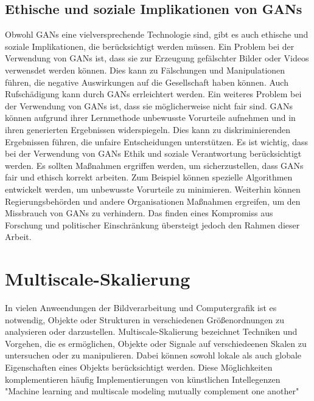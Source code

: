     \subsection{Ethische und soziale Implikationen von GANs}
    
        Obwohl GANs eine vielversprechende Technologie sind, gibt es auch ethische und soziale Implikationen, die berücksichtigt werden müssen. 
        Ein Problem bei der Verwendung von GANs ist, dass sie zur Erzeugung gefälschter Bilder oder Videos verwensdet werden können. 
        Dies kann zu Fälschungen und Manipulationen führen, die negative Auswirkungen auf die Gesellschaft haben können.
        Auch Rufschädigung kann durch GANs errleichtert werden.
        Ein weiteres Problem bei der Verwendung von GANs ist, dass sie möglicherweise nicht fair sind. 
        GANs können aufgrund ihrer Lernmethode unbewusste Vorurteile aufnehmen und in ihren generierten Ergebnissen widerspiegeln. 
        Dies kann zu diskriminierenden Ergebnissen führen, die unfaire Entscheidungen unterstützen.%
        Es ist wichtig, dass bei der Verwendung von GANs Ethik und soziale Verantwortung berücksichtigt werden. 
        Es sollten Maßnahmen ergriffen werden, um sicherzustellen, dass GANs fair und ethisch korrekt arbeiten. 
        Zum Beispiel können spezielle Algorithmen entwickelt werden, um unbewusste Vorurteile zu minimieren. 
        Weiterhin können Regierungsbehörden und andere Organisationen Maßnahmen ergreifen, um den Missbrauch von GANs zu verhindern. 
        Das finden eines Kompromiss aus Forschung und politischer Einschränkung übersteigt jedoch den Rahmen dieser Arbeit. 
    
\section{Multiscale-Skalierung}

    In vielen Anweendungen der Bildverarbeitung und Computergrafik ist es notwendig, Objekte oder Strukturen in verschiedenen Größenordnungen zu analysieren oder darzustellen. 
    Multiscale-Skalierung bezeichnet Techniken und Vorgehen, die es ermöglichen, Objekte oder Signale auf verschiedeenen Skalen zu untersuchen oder zu manipulieren. Dabei können sowohl lokale als auch globale Eigenschaften eines Objekts berücksichtigt werden.
    Diese Möglichkeiten komplementieren häufig Implementierungen von künstlichen Intellegenzen
    "Machine learning and multiscale modeling mutually complement one another"
    
